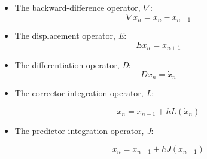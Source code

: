\begin{enumerate}
\begin{itemize}
\item The backward-difference operator, $\nabla$:
\begin{equation}
\nabla x_{n}=x_{n}-x_{n-1}
\end{equation}

\item The displacement operator, \textit{E}:
\begin{equation}
Ex_{n}=x_{n+1}
\end{equation}

\item The differentiation operator, \textit{D}:
\begin{equation}
Dx_{n}=\dot{x}_{n}
\end{equation}

\item The corrector integration operator, \textit{L}:

\begin{equation} \label{eq:L_def}
x_{n}=x_{n-1}+hL({\dot{x}}_{n})
\end{equation}

\item The predictor integration operator, \textit{J}:

\begin{equation} \label{eq:J_def}
x_{n}=x_{n-1}+hJ({\dot{x}}_{n-1})
\end{equation} 
\end{itemize}
\end{enumerate}


